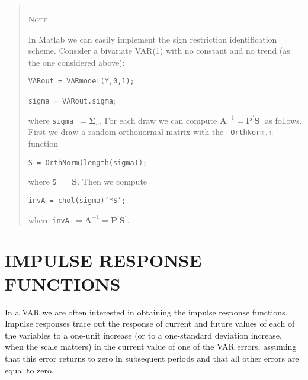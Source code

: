\documentclass[11pt,a4paper]{report}
\numberwithin{equation}{chapter}
\numberwithin{section}{chapter}
\begin{document}
%
\begin{quotation}
\noindent \rule{1cm}{.4pt}   {\scshape Note}   \hrulefill
\vspace{-.36cm}

\noindent \hrulefill
\small
\singlespacing
\color{note}\sffamily%

In Matlab we can easily implement the sign restriction identification
scheme. Consider a bivariate VAR(1) with no constant and no trend (as the
one considered above):\medskip

\texttt{VARout = VARmodel(Y,0,1);}

\texttt{sigma = VARout.sigma}\medskip ;

\noindent where \texttt{sigma }$=\mathbf{\Sigma }_{u}$. For each draw we can
compute $\mathbf{A}^{-1}=\mathbf{P}^{\prime }\mathbf{S}^{\prime }$ as
follows. First we draw a random orthonormal matrix with the \texttt{%
OrthNorm.m} function\medskip

\texttt{S = OrthNorm(length(sigma));}\medskip

\noindent where \texttt{S }$=\mathbf{S.}$ Then we compute\medskip

\texttt{invA = chol(sigma)'*S';}\medskip

\noindent where \texttt{invA }$=\mathbf{A}^{-1}=\mathbf{P}^{\prime }\mathbf{S%
}^{\prime }$.

%
\color{black}
\noindent \hrulefill 
\vspace{-.5cm}

\noindent \hrulefill
\end{quotation}
\bigskip%

\chapter{IMPULSE RESPONSE FUNCTIONS}

In a VAR we are often interested in obtaining the impulse response
functions. Impulse responses trace out the response of current and future
values of each of the variables to a one-unit increase (or to a one-standard
deviation increase, when the scale matters) in the current value of one of
the VAR errors, assuming that this error returns to zero in subsequent
periods and that all other errors are equal to zero.
\end{document}
